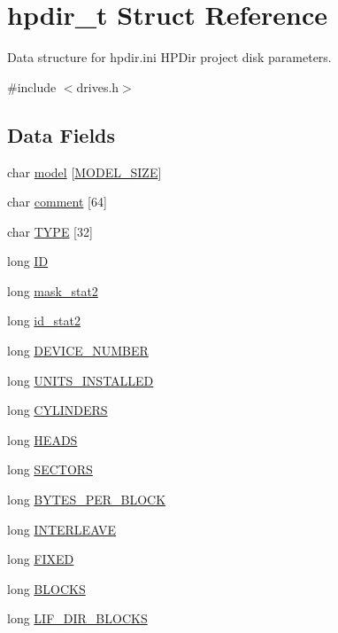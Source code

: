 \hypertarget{structhpdir__t}{}\section{hpdir\+\_\+t Struct Reference}
\label{structhpdir__t}


Data structure for hpdir.\+ini H\+P\+Dir project disk parameters.  




{\ttfamily \#include $<$drives.\+h$>$}

\subsection*{Data Fields}
\begin{DoxyCompactItemize}
\item 
char \hyperlink{structhpdir__t_a3855aafd93d84611573376653f9cd2c0}{model} \mbox{[}\hyperlink{drives_8h_a3f11d81c1e6d925611a9bdd5115064a0}{M\+O\+D\+E\+L\+\_\+\+S\+I\+ZE}\mbox{]}
\item 
char \hyperlink{structhpdir__t_aa2ba4f9a627c74e84a515e8ac4893bfb}{comment} \mbox{[}64\mbox{]}
\item 
char \hyperlink{structhpdir__t_ad2f925b088d4fd746c9ea789f34f9507}{T\+Y\+PE} \mbox{[}32\mbox{]}
\item 
long \hyperlink{structhpdir__t_aae1a879f64c0ee2dc353d3581e8deec9}{ID}
\item 
long \hyperlink{structhpdir__t_a788d1032b8ff695092f9e4ff4cf36adf}{mask\+\_\+stat2}
\item 
long \hyperlink{structhpdir__t_a1e3ef48d576fa036c6147ec0c5ec3aed}{id\+\_\+stat2}
\item 
long \hyperlink{structhpdir__t_a3e761e4a98a5fdbd789ebf89c50b805f}{D\+E\+V\+I\+C\+E\+\_\+\+N\+U\+M\+B\+ER}
\item 
long \hyperlink{structhpdir__t_a748150d5e0351e2d827f2a4def385ca9}{U\+N\+I\+T\+S\+\_\+\+I\+N\+S\+T\+A\+L\+L\+ED}
\item 
long \hyperlink{structhpdir__t_ac153c658b4e5333b529826d125d40e1e}{C\+Y\+L\+I\+N\+D\+E\+RS}
\item 
long \hyperlink{structhpdir__t_a0b636f508776a07e2aaba4704dc124f2}{H\+E\+A\+DS}
\item 
long \hyperlink{structhpdir__t_a6ee950a83086b3872cfd8fab8d809bf2}{S\+E\+C\+T\+O\+RS}
\item 
long \hyperlink{structhpdir__t_acc3554bcff7efd7615ed958a1af6366a}{B\+Y\+T\+E\+S\+\_\+\+P\+E\+R\+\_\+\+B\+L\+O\+CK}
\item 
long \hyperlink{structhpdir__t_ade75ac3fc0b7d605383ca3203ba140bf}{I\+N\+T\+E\+R\+L\+E\+A\+VE}
\item 
long \hyperlink{structhpdir__t_a69855da74bcc15b10039a51e3680a994}{F\+I\+X\+ED}
\item 
long \hyperlink{structhpdir__t_a4b4f32c9b9cfe558ce5fbd51d65b5db3}{B\+L\+O\+C\+KS}
\item 
long \hyperlink{structhpdir__t_a8b6c34460bb1c291860bbb82c56660a4}{L\+I\+F\+\_\+\+D\+I\+R\+\_\+\+B\+L\+O\+C\+KS}
\end{DoxyCompactItemize}


